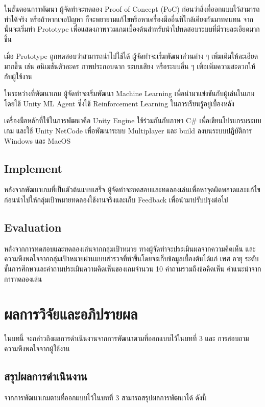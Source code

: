 \documentclass[12pt,oneside,openright,a4paper]{cpe-thai-project}
\begin{document}
ในขั้นตอนการพัฒนา ผู้จัดทำจะทดลอง Proof of Concept (PoC) ก่อนว่าสิ่งที่ออกแบบไว้สามารถทำได้จริง 
หรือถ้าหากเจอปัญหา ก็จะพยายามแก้ไขหรือหาเครื่องมืออื่นที่ใกล้เคียงกันมาทดแทน จากนั้นจะเริ่มทำ Prototype 
เพื่อแสดงภาพรวมเกมเบื้องต้นสำหรับนำไปทดสอบระบบที่มีรายละเอียดมากขึ้น 

เมื่อ Prototype ถูกทดสอบว่าสามารถนำไปใช้ได้ ผู้จัดทำจะเริ่มพัฒนาส่วนต่าง ๆ เพิ่มเติมให้ละเอียดมากขึ้น เช่น 
อนิเมชันตัวละคร ภาพประกอบฉาก ระบบเสียง หรือระบบอื่น ๆ เพื่อเพิ่มความสะดวกให้กับผู้ใช้งาน

ในระหว่างที่พัฒนาเกม ผู้จัดทำจะเริ่มพัฒนา Machine Learning เพื่อนำมาแข่งขันกับผู้เล่นในเกม โดยใช้ 
Unity ML Agent ซึ่งใช้ Reinforcement Learning ในการเรียนรู้อยู่เบื้องหลัง

เครื่องมือหลักที่ใช้ในการพัฒนาคือ Unity Engine ใช้ร่วมกันกับภาษา C\# เพื่อเขียนโปรแกรมระบบเกม 
และใช้ Unity NetCode เพื่อพัฒนาระบบ Multiplayer และ build ลงบนระบบปฏิบัติการ Windows และ MacOS 

\section{Implement}

หลังจากพัฒนาเกมที่เป็นตัวต้นแบบเสร็จ ผู้จัดทำจะทดสอบและทดลองเล่นเพื่อหาจุดผิดพลาดและแก้ไข 
ก่อนนำไปให้กลุ่มเป้าหมายทดลองใช้งานจริงและเก็บ Feedback เพื่อนำมาปรับปรุงต่อไป


\section{Evaluation}

หลังจากการทดสอบและทดลองเล่นจากกลุ่มเป้าหมาย ทางผู้จัดทำจะประเมินผลจากความคิดเห็น
และความพึงพอใจจากกลุ่มเป้าหมายผ่านแบบสำรวจที่ทำขึ้นโดยจะเก็บข้อมูลเบื้องต้นได้แก่ เพศ อายุ 
ระดับชั้นการศึกษาและคำถามประเมินความคิดเห็นของเกมจำนวน 10 คำถามรวมถึงข้อคิดเห็น คำแนะนำจากการทดลองเล่น

\chapter{ผลการวิจัยและอภิปรายผล}
ในบทนี้ จะกล่าวถึงผลการดำเนินงานจากการพัฒนาตามที่ออกแบบไว้ในบทที่ 3 และ
การสอบถามความพึงพอใจจากผู้ใช้งาน

\section{สรุปผลการดำเนินงาน} 
จากการพัฒนาเกมตามที่ออกแบบไว้ในบทที่ 3 สามารถสรุปผลการพัฒนาได้ ดังนี้
\end{document}
